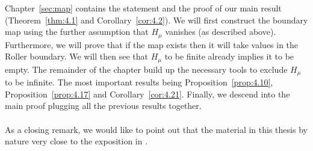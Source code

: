 Chapter~\ref{sec:map} contains the statement and the proof of our main result (Theorem~\ref{thm:4.1} and Corollary~\ref{cor:4.2}). We will first construct the boundary map using the further assumption that \(H_\mu\) vanishes (as described above). Furthermore, we will prove that if the map exists then it will take values in the Roller boundary. We will then see that \(H_\mu\) to be finite already implies it to be empty. The remainder of the chapter build up the necessary tools to exclude \(H_\mu\) to be infinite. The most important results being Proposition~\ref{prop:4.10}, Proposition~\ref{prop:4.17} and Corollary~\ref{cor:4.21}. Finally, we descend into the main proof plugging all the previous results together.
\\
\\
As a closing remark, we would like to point out that the material in this thesis by nature very close to the exposition in \textcite{MR3509968}.
